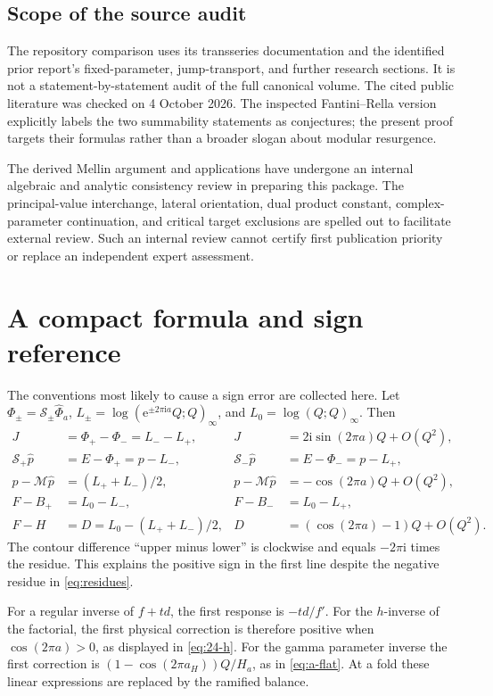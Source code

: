 \documentclass[11pt,a4paper]{article}
\numberwithin{equation}{section}
\theoremstyle{definition}
\theoremstyle{remark}\newtheorem{remark}[theorem]{Remark}
\newcommand{\ii}{\mathrm i}\newcommand{\e}{\mathrm e}
\newcommand{\Med}{\mathcal M}\newcommand{\eps}{\varepsilon}
\begin{document}
\subsection*{Scope of the source audit}
The repository comparison uses its transseries documentation and the
identified prior report's fixed-parameter, jump-transport, and further
research sections. It is not a statement-by-statement audit of the full
canonical volume. The cited public literature was checked on 4 October
2026. The inspected Fantini--Rella version explicitly labels the two
summability statements as conjectures; the present proof targets their
formulas rather than a broader slogan about modular resurgence.

The derived Mellin argument and applications have undergone an internal
algebraic and analytic consistency review in preparing this package.
The principal-value interchange, lateral orientation, dual product
constant, complex-parameter continuation, and critical target exclusions
are spelled out to facilitate external review. Such an internal review
cannot certify first publication priority or replace an independent
expert assessment.

\section{A compact formula and sign reference}
\label{app:signs}
The conventions most likely to cause a sign error are collected here.
Let $\Phi_\pm=\mathcal S_\pm\widehat\Phi_a$,
$L_\pm=\log(\e^{\pm2\pi\ii a}Q;Q)_\infty$, and
$L_0=\log(Q;Q)_\infty$. Then
\begin{align*}
 J&=\Phi_+-\Phi_-=L_--L_+,
       &J&=2\ii\sin(2\pi a)Q+O(Q^2),\\
 \mathcal S_+\widehat p&=E-\Phi_+=p-L_-,
       &\mathcal S_-\widehat p&=E-\Phi_-=p-L_+,\\
 p-\Med\widehat p&=(L_++L_-)/2,
       &p-\Med\widehat p&=-\cos(2\pi a)Q+O(Q^2),\\
 F-B_+&=L_0-L_-,
       &F-B_-&=L_0-L_+,\\
 F-H&=D=L_0-(L_++L_-)/2,
       &D&=(\cos(2\pi a)-1)Q+O(Q^2).
\end{align*}
The contour difference ``upper minus lower'' is clockwise and equals
$-2\pi\ii$ times the residue. This explains the positive sign in the
first line despite the negative residue in \eqref{eq:residues}.

For a regular inverse of $f+td$, the first response is $-td/f'$.
For the $h$-inverse of the factorial, the first physical correction is
therefore positive when $\cos(2\pi a)>0$, as displayed in
\eqref{eq:24-h}. For the gamma parameter inverse the first correction
is $(1-\cos(2\pi a_H))Q/H_a$, as in \eqref{eq:a-flat}.
At a fold these linear expressions are replaced by the ramified balance.
\end{document}
